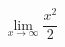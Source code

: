 \documentclass[border=2pt,varwidth=true]{standalone}
\begin{document}
\begin{displaymath}
\lim_{x \to \infty} \frac{x^2}{2} 
\end{displaymath}
\end{document}
